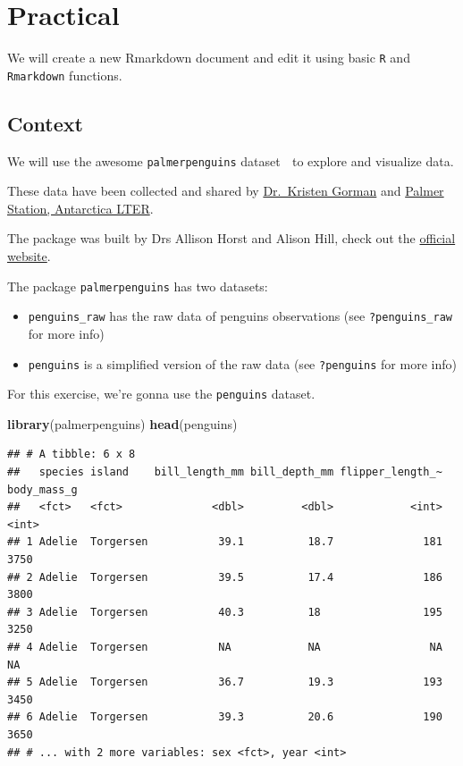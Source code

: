 \documentclass[
  12pt,
]{book}
\newenvironment{Shaded}{\begin{snugshade}}{\end{snugshade}}
\newcommand{\KeywordTok}[1]{\textcolor[rgb]{0.13,0.29,0.53}{\textbf{#1}}}
\newcommand{\NormalTok}[1]{#1}
\providecommand{\tightlist}{%
  \setlength{\itemsep}{0pt}\setlength{\parskip}{0pt}}
\begin{document}
\hypertarget{practical}{%
\section{Practical}\label{practical}}

We will create a new Rmarkdown document and edit it using basic \texttt{R} and \texttt{Rmarkdown} functions.

\hypertarget{context}{%
\subsection{Context}\label{context}}

We will use the awesome \texttt{palmerpenguins} dataset 🐧 to explore and visualize data.

These data have been collected and shared by \href{https://www.uaf.edu/cfos/people/faculty/detail/kristen-gorman.php}{Dr.~Kristen Gorman} and \href{https://pal.lternet.edu/}{Palmer Station, Antarctica LTER}.

The package was built by Drs Allison Horst and Alison Hill, check out the \href{https://allisonhorst.github.io/palmerpenguins/}{official website}.

The package \texttt{palmerpenguins} has two datasets:

\begin{itemize}
\tightlist
\item
  \texttt{penguins\_raw} has the raw data of penguins observations (see \texttt{?penguins\_raw} for more info)
\item
  \texttt{penguins} is a simplified version of the raw data (see \texttt{?penguins} for more info)
\end{itemize}

For this exercise, we're gonna use the \texttt{penguins} dataset.

\begin{Shaded}
\begin{Highlighting}[]
\KeywordTok{library}\NormalTok{(palmerpenguins)}
\KeywordTok{head}\NormalTok{(penguins)}
\end{Highlighting}
\end{Shaded}

\begin{verbatim}
## # A tibble: 6 x 8
##   species island    bill_length_mm bill_depth_mm flipper_length_~ body_mass_g
##   <fct>   <fct>              <dbl>         <dbl>            <int>       <int>
## 1 Adelie  Torgersen           39.1          18.7              181        3750
## 2 Adelie  Torgersen           39.5          17.4              186        3800
## 3 Adelie  Torgersen           40.3          18                195        3250
## 4 Adelie  Torgersen           NA            NA                 NA          NA
## 5 Adelie  Torgersen           36.7          19.3              193        3450
## 6 Adelie  Torgersen           39.3          20.6              190        3650
## # ... with 2 more variables: sex <fct>, year <int>
\end{verbatim}
\end{document}
